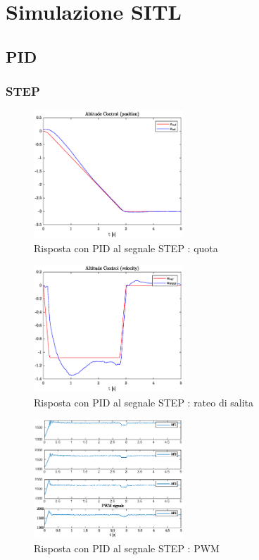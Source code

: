 \section{Simulazione SITL}
\subsection{PID}
\subsubsection{STEP}
\begin{figure}
	\centering
	\includegraphics[width=0.5\textwidth]{Simulazioni/Figure/PID/STEP/AltitudeControlPos}
	\caption{Risposta con PID al segnale STEP : quota}
\end{figure}

\begin{figure}
	\centering
	\includegraphics[width=0.5\textwidth]{Simulazioni/Figure/PID/STEP/AltitudeControlVel}
	\caption{Risposta con PID al segnale STEP : rateo di salita}
\end{figure}

\begin{figure}
	\centering
	\includegraphics[width=0.5\textwidth]{Simulazioni/Figure/PID/STEP/PWM}
	\caption{Risposta con PID al segnale STEP : PWM}
\end{figure}

